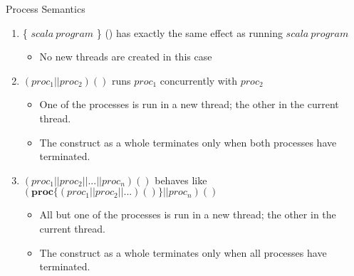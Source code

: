 \documentclass{concdistfoils}
\def\subheading#1{\begin{cframed}[8.8in]{#1}\end{cframed}}
\begin{document}
\begin{slide}
\subheading{Process Semantics}
\vfill
\begin{enumerate}
\item {} \{ $scala~program$ \} () has exactly the same effect as running $scala~program$
\begin{itemize}
        \item No new threads are created in this case
\end{itemize}
 \vfill       
\item $(proc_1 \mathrel{||} proc_2)()$ runs $proc_1$ concurrently with $proc_2$        
\begin{itemize}
        \item One of the processes is run in a new thread; the other in the current thread.
        
        \item The construct as a whole terminates only when both processes have terminated.
\end{itemize}
\vfill
\item $(proc_1 \mathrel{||} proc_2 \mathrel{||} ... \mathrel{||} proc_n)()$ behaves like
      $(\mathbf{proc}\{(proc_1 \mathrel{||} proc_2 \mathrel{||} ... )()\}\mathrel{||} proc_n)()$
\begin{itemize}
        \item All but one of the processes is run in a new thread; the other in the current thread.
        
        \item The construct as a whole terminates only when all processes have terminated.
\end{itemize}
\end{enumerate}
\vfill
\end{slide}
\end{document}
